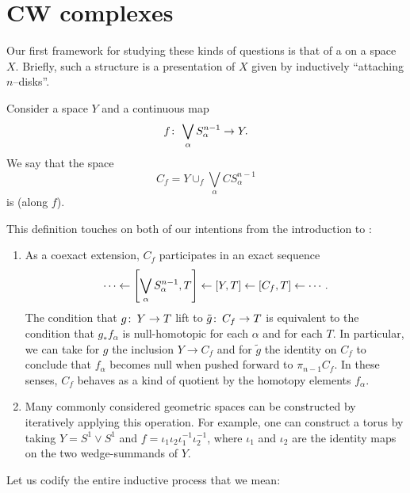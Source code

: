 \section{CW complexes}

Our first framework for studying these kinds of questions is that of a  on a space $X$.
Briefly, such a structure is a presentation of $X$ given by inductively ``attaching $n$--disks''.

\begin{definition}
Consider a space $Y$ and a continuous map \[f\colon\thinspace \bigvee_\alpha S^{n-1}_\alpha \to Y.\]
We say that the space \[C_f = Y \cup_f \bigvee_\alpha CS^{n-1}_\alpha\] is  (along $f$).
\end{definition}

\noindent
This definition touches on both of our intentions from the introduction to :
\begin{enumerate}
    \item
    As a coexact extension, $C_f$ participates in an exact sequence \[\cdots \leftarrow \left[ \bigvee_\alpha S^{n-1}_\alpha, T \right] \leftarrow [Y, T] \leftarrow [C_f, T] \leftarrow \cdots.\]
    The condition that $g\colon\thinspace Y \to T$ lift to $\tilde g\colon\thinspace C_f \to T$ is equivalent to the condition that $g_* f_\alpha$ is null-homotopic for each $\alpha$ and for each $T$.
    In particular, we can take for $g$ the inclusion $Y \to C_f$ and for $\tilde g$ the identity on $C_f$ to conclude that $f_\alpha$ becomes null when pushed forward to $\pi_{n-1} C_f$.
    In these senses, $C_f$ behaves as a kind of quotient by the homotopy elements $f_\alpha$.
    \item
    Many commonly considered geometric spaces can be constructed by iteratively applying this operation.
    For example, one can construct a torus by taking $Y = S^1 \vee S^1$ and $f = \iota_1 \iota_2 \iota_1^{-1} \iota_2^{-1}$, where $\iota_1$ and $\iota_2$ are the identity maps on the two wedge-summands of $Y$.
\end{enumerate}

Let us codify the entire inductive process that we mean:

